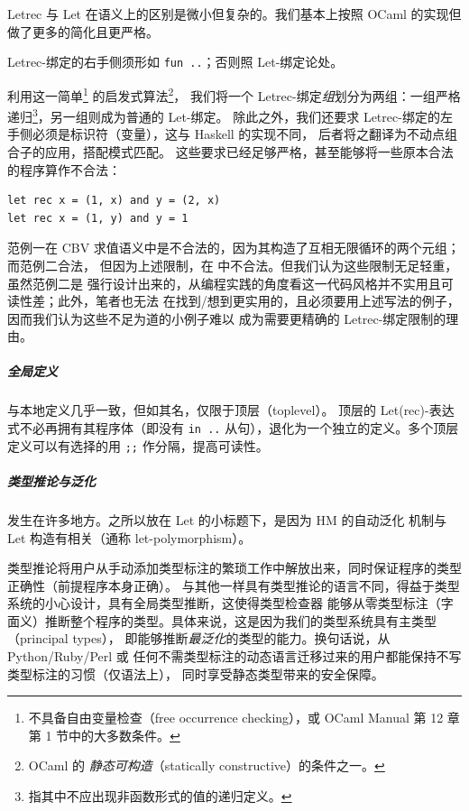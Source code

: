 Letrec 与 Let 在语义上的区别是微小但复杂的。我们基本上按照 OCaml 的实现但做了更多的简化且更严格。
\begin{definition}
  Letrec-绑定的右手侧须形如 \texttt{fun ..}；否则照 Let-绑定论处。
\end{definition}
利用这一简单\footnote{
  不具备自由变量检查（free occurrence checking），或 OCaml Manual 第 12 章第 1 节中的大多数条件。
}
的启发式算法\footnote{OCaml 的 \emph{静态可构造}（statically constructive）的条件之一。}，
我们将一个 Letrec-绑定\emph{组}划分为两组：一组严格递归\footnote{
  指其中不应出现非函数形式的值的递归定义。
}，另一组则成为普通的 Let-绑定。
除此之外，我们还要求 Letrec-绑定的左手侧必须是标识符（变量），这与 Haskell 的实现不同，
后者将之翻译为不动点组合子的应用，搭配模式匹配。
这些要求已经足够严格，甚至能够将一些原本合法的程序算作不合法：
\begin{verbatim}
let rec x = (1, x) and y = (2, x)
let rec x = (1, y) and y = 1
\end{verbatim}
范例一在 CBV 求值语义中是不合法的，因为其构造了互相无限循环的两个元组；而范例二合法，
但因为上述限制，在 \Tigris 中不合法。但我们认为这些限制无足轻重，虽然范例二是
强行设计出来的，从编程实践的角度看这一代码风格并不实用且可读性差；此外，笔者也无法
在找到/想到更实用的，且必须要用上述写法的例子，因而我们认为这些不足为道的小例子难以
成为需要更精确的 Letrec-绑定限制的理由。

{\setlength{\parskip}{-1em}\subparagraph*{全局定义} 与本地定义几乎一致，但如其名，仅限于顶层（toplevel）。
  顶层的 Let(rec)-表达式不必再拥有其程序体（即没有 \texttt{in ..} 从句），退化为一个独立的定义。多个顶层定义可以有选择的用 \texttt{;;} 作分隔，提高可读性。

  \subparagraph*{类型推论与泛化} 发生在许多地方。之所以放在 Let 的小标题下，是因为 HM 的自动泛化
  机制与 Let 构造有相关（通称 let-polymorphism）。
}
类型推论将用户从手动添加类型标注的繁琐工作中解放出来，同时保证程序的类型正确性（前提程序本身正确）。
与其他一样具有类型推论的语言不同，得益于类型系统的小心设计，\Tigris 具有全局类型推断，这使得类型检查器
能够从零类型标注（字面义）推断整个程序的类型。具体来说，这是因为我们的类型系统具有主类型（principal types），
即能够推断\emph{最泛化}的类型的能力。换句话说，从 Python/Ruby/Perl 或
任何不需类型标注的动态语言迁移过来的用户都能保持不写类型标注的习惯（仅语法上），
同时享受静态类型带来的安全保障。

